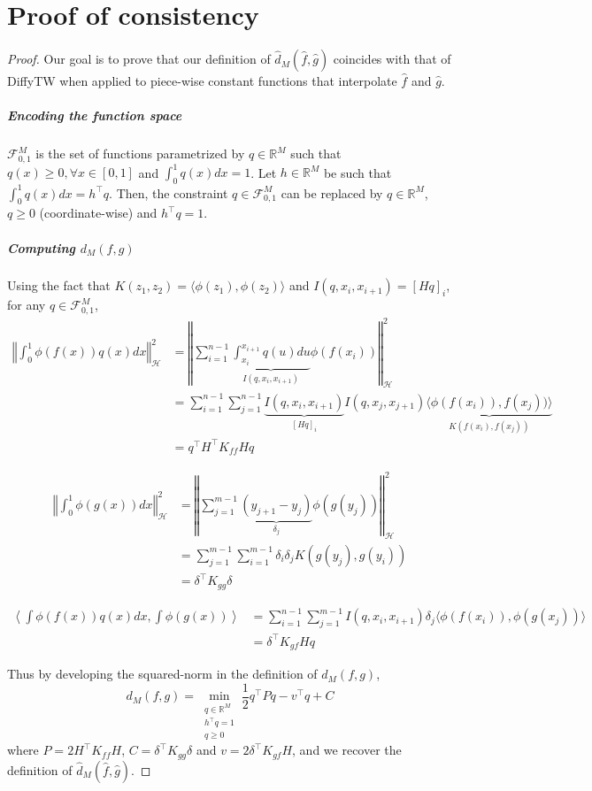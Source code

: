\section{Proof of consistency}\label{proof:prob-qp}
\begin{proof}
Our goal is to prove that our definition of $\hat d_M(\hat f, \hat g)$ coincides with that of DiffyTW when applied to piece-wise constant functions that interpolate $\hat f$ and $\hat g$.

\subparagraph{Encoding the function space} $\mathcal F_{0, 1}^M$ is the set of functions parametrized by $q\in\mathbb R^M$ such that $q(x) \geq 0, \forall x\in [0,1]$ and $\int_0^1 q(x)dx= 1$. Let $h\in\mathbb R^M$ be such that $\int_0^1q(x)dx = h^\top q$. Then, the constraint $q\in\mathcal F_{0,1}^M$ can be replaced by $q\in\mathbb R^M$, $q\geq 0$ (coordinate-wise) and $h^\top q = 1$.


\subparagraph{Computing $d_M(f, g)$} Using the fact that $K(z_1, z_2) = \langle \phi(z_1), \phi(z_2)\rangle$ and $I(q, x_i, x_{i+1}) = [Hq]_i$, for any $q\in\mathcal F_{0,1}^M$,
\begin{align}
\left \Vert \int_0^1 \phi(f(x))q(x)dx \right\Vert^2_\mathcal H&=\left\Vert\sum_{i=1}^{n-1} \underbrace{\int_{x_i}^{x_{i+1}}q(u)du}_{I(q, x_i, x_{i+1})}\phi(f(x_i))\right\Vert_\mathcal H^2\\
&=\sum_{i=1}^{n-1}\sum_{j=1}^{n-1}\underbrace{I(q, x_i, x_{i+1})}_{[Hq]_i}I(q, x_j, x_{j+1})\underbrace{\langle \phi(f(x_i)), f(x_j))\rangle}_{K(f(x_i), f(x_j))}\\
&= q^\top H^\top K_{ff} H q
\end{align}

\begin{align}
\left\Vert\int_0^1\phi(g(x))dx\right\Vert_\mathcal H^2 &= \left\Vert\sum_{j=1}^{m-1} \underbrace{(y_{j+1} - y_j)}_{\delta_j}\phi(g(y_j))\right\Vert_\mathcal H^2\\
&= \sum_{j=1}^{m-1} \sum_{i=1}^{m-1} \delta_i \delta_j K(g(y_j), g(y_i))\\
& = \delta^\top K_{gg} \delta
\end{align}

\begin{align}
\left\langle \int\phi(f(x))q(x)dx, \int\phi(g(x))\right\rangle&=\sum_{i=1}^{n-1}\sum_{j=1}^{m-1} I(q, x_i, x_{i+1}) \delta_j \langle \phi(f(x_i)), \phi(g(x_j))\rangle\\
&= \delta^\top K_{gf} Hq
\end{align}

Thus by developing the squared-norm in the definition of $d_M(f, g)$,
\begin{equation}
d_M(f, g) = \min_{\substack{q\in\mathbb R^M \\ h^\top q = 1 \\ q \geq 0}} \frac{1}{2} q^\top P q - v^\top q + C
\end{equation}
where $P = 2 H^\top K_{ff}H$, $C = \delta^\top K_{gg}\delta$ and $v = 2\delta^\top K_{gf}H$, and we recover the definition of $\hat d_M(\hat f, \hat g)$.
\end{proof}

